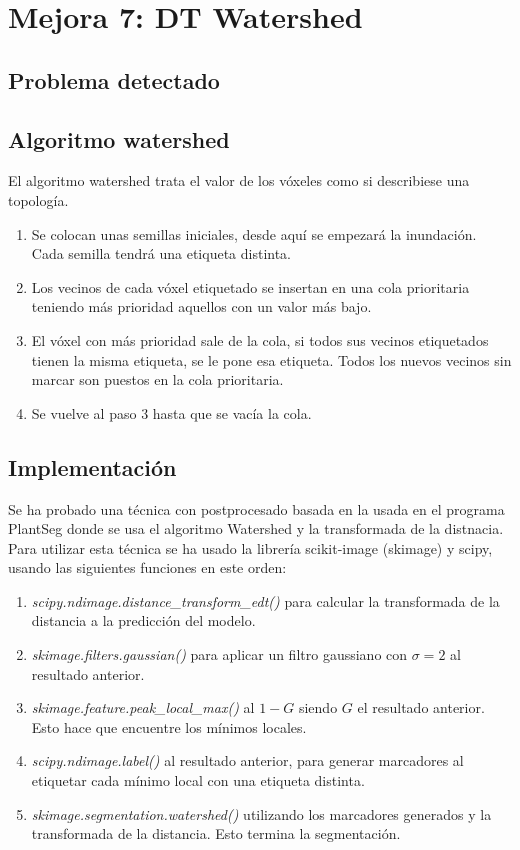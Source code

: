 \chapter{Mejora 7: DT Watershed}\label{dt_watershed}

\section{Problema detectado}\label{sec:dt_watershed_apex_problem}

\section{Algoritmo watershed}\label{sec:dt_watershed_watershed}

El algoritmo watershed trata el valor de los vóxeles como si describiese una topología.
\begin{enumerate}
\item Se colocan unas semillas iniciales, desde aquí se empezará la inundación. Cada semilla tendrá una etiqueta distinta.
\item Los vecinos de cada vóxel etiquetado se insertan en una cola prioritaria teniendo más prioridad aquellos con un valor más bajo.
\item El vóxel con más prioridad sale de la cola, si todos sus vecinos etiquetados tienen la misma etiqueta, se le pone esa etiqueta. Todos los nuevos vecinos sin marcar son puestos en la cola prioritaria.
\item Se vuelve al paso 3 hasta que se vacía la cola.
\end{enumerate}

\section{Implementación}\label{sec:dt_watershed_implementation}

Se ha probado una técnica con postprocesado basada en la usada en el programa PlantSeg \cite{Wolny2020} donde se usa el algoritmo Watershed y la transformada de la distnacia. Para utilizar esta técnica se ha usado la librería scikit-image (skimage) y scipy, usando las siguientes funciones en este orden:
\begin{enumerate}
\item \textit{scipy.ndimage.distance\_transform\_edt()} para calcular la transformada de la distancia a la predicción del modelo.
\item \textit{skimage.filters.gaussian()} para aplicar un filtro gaussiano con $\sigma = 2$ al resultado anterior.
\item \textit{skimage.feature.peak\_local\_max()} al $1 - G$ siendo $G$ el resultado anterior. Esto hace que encuentre los mínimos locales.
\item \textit{scipy.ndimage.label()} al resultado anterior, para generar marcadores al etiquetar cada mínimo local con una etiqueta distinta.
\item \textit{skimage.segmentation.watershed()} utilizando los marcadores generados y la transformada de la distancia. Esto termina la segmentación.
\end{enumerate}

